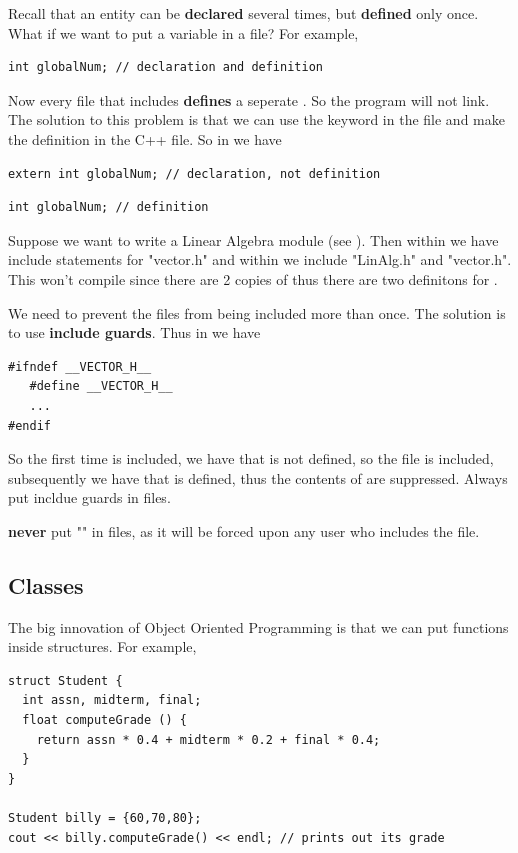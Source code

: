 \documentclass[english, 11pt]{article}
\begin{document}
Recall that an entity can be \textbf{declared} several times, but \textbf{defined} only once. What if we want to put a variable in a  file? For example, 
\begin{lstlisting}
int globalNum; // declaration and definition
\end{lstlisting}
Now every file that includes  \textbf{defines} a seperate . So the program will not link. The solution to this problem is that we can use the  keyword in the  file and make the definition in the C++ file. So in  we have
\begin{lstlisting}[title=abc.h]
extern int globalNum; // declaration, not definition
\end{lstlisting}
\begin{lstlisting}[title=abc.cc]
int globalNum; // definition
\end{lstlisting}

\begin{exmp}
  Suppose we want to write a Linear Algebra module (see ). Then within  we have include statements for "vector.h" and within  we include "LinAlg.h" and "vector.h". This won't compile since there are 2 copies of  thus there are two definitons for .
\end{exmp}

We need to prevent the files from being included more than once. The solution is to use \textbf{include guards}. Thus in  we have
\begin{lstlisting}
#ifndef __VECTOR_H__
   #define __VECTOR_H__
   ...
#endif
\end{lstlisting}
So the first time  is included, we have that  is not defined, so the file is included, subsequently we have that  is defined, thus the contents of  are suppressed. Always put incldue guards in  files.
\begin{note}
  \textbf{never} put "" in  files, as it will be forced upon any user who includes the file.
\end{note}

\subsection{Classes}

The big innovation of Object Oriented Programming is that we can put functions inside structures. For example,
\begin{lstlisting}
struct Student {
  int assn, midterm, final;
  float computeGrade () {
    return assn * 0.4 + midterm * 0.2 + final * 0.4;
  }
}

Student billy = {60,70,80};
cout << billy.computeGrade() << endl; // prints out its grade
\end{lstlisting}
\end{document}
